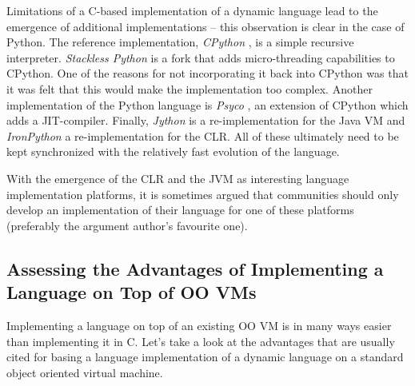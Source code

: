 \documentclass{llncs}
\begin{document}
\def\implname#1{\emph{#1}}

Limitations of a C-based implementation of a dynamic
language lead to the emergence of additional implementations --
this observation is clear
in the case of Python.  The reference implementation, \implname{CPython}
\cite{cpy251}, is a simple recursive interpreter.  \implname{Stackless
Python} \cite{stackless} is a fork that adds micro-threading
capabilities to CPython. One of the reasons for not incorporating it back
into CPython was that it was felt that this would make the
implementation too complex. Another implementation of the Python
language is \implname{Psyco} \cite{psyco-software}, an extension of
CPython which adds a JIT-compiler.  Finally, \implname{Jython} is a
re-implementation for the Java VM and \implname{IronPython}
a re-implementation for
the CLR.  All of these ultimately need to be kept synchronized with the
relatively fast evolution of the language.

With the emergence of the CLR and the JVM as interesting language
implementation platforms, it is sometimes argued that
communities should only develop an implementation of their language
for one of these platforms (preferably the argument author's favourite
one).

\subsection{Assessing the Advantages of Implementing a Language on Top of OO
VMs}

Implementing a language on top of an existing OO VM is in many ways easier than
implementing it in C. Let's take a look at the advantages that are usually
cited for basing a
language implementation of a dynamic language on a standard object oriented
virtual machine.
\end{document}
